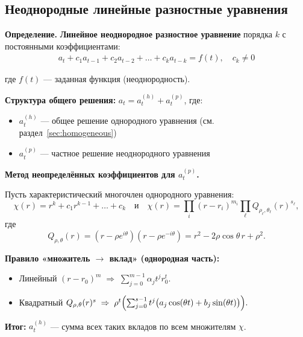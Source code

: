 \subsection{Неоднородные линейные разностные уравнения}\label{sec:inhomogeneous}


\textbf{Определение.} \textbf{Линейное неоднородное разностное уравнение} порядка $k$ с постоянными коэффициентами:
\begin{align}
a_t + c_1 a_{t-1} + c_2 a_{t-2} + \dots + c_k a_{t-k} = f(t), \quad c_k \neq 0
\end{align}

где $f(t)$ — заданная функция (неоднородность).

\textbf{Структура общего решения:} $a_t = a_t^{(h)} + a_t^{(p)}$, где:
\begin{itemize}
\item $a_t^{(h)}$ — общее решение однородного уравнения (см. раздел~\ref{sec:homogeneous})
\item $a_t^{(p)}$ — частное решение неоднородного уравнения
\end{itemize}

\textbf{Метод неопределённых коэффициентов для $a_t^{(p)}$.}

Пусть характеристический многочлен однородного уравнения:
\[
\chi(r) = r^k + c_1 r^{k-1} + \dots + c_k
\quad \text{и} \quad
\chi(r) = \prod_i (r-r_i)^{m_i} \prod_\ell Q_{\rho_\ell, \theta_\ell}(r)^{s_\ell},
\]
где
\[
Q_{\rho,\theta}(r) = (r - \rho e^{i\theta})(r - \rho e^{-i\theta}) = r^2 - 2\rho \cos\theta \, r + \rho^2.
\]

\textbf{Правило «множитель $\to$ вклад» (однородная часть):}

\begin{itemize}
\item Линейный $(r-r_0)^m \;\Rightarrow\; \sum_{j=0}^{m-1} \alpha_j t^j r_0^t.$

\item Квадратный $Q_{\rho,\theta}(r)^s \;\Rightarrow\;
\rho^t \Bigl( \sum_{j=0}^{s-1} t^j \bigl(a_j \cos(\theta t) + b_j \sin(\theta t)\bigr)\Bigr).$
\end{itemize}

\textbf{Итог:} $a_t^{(h)}$ — сумма всех таких вкладов по всем множителям $\chi$.

